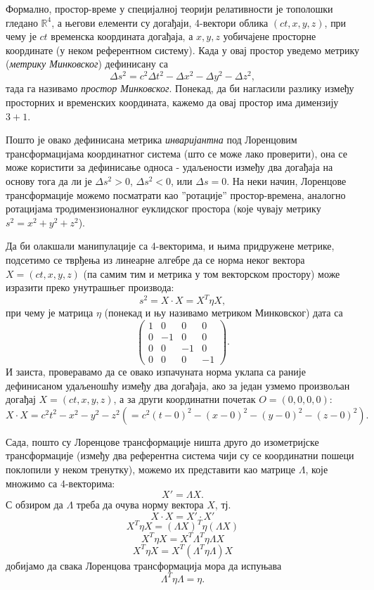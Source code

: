 \documentclass{report}
\theoremstyle{plain}
\theoremstyle{definition}
\begin{document}
Формално, простор-време у специјалној теорији релативности је тополошки гледано $\mathbb{R}^4$, а његови елементи су догађаји, 4-вектори облика $(ct, x, y, z)$, при чему је $ct$ временска координата догађаја, а $x, y, z$ уобичајене просторне координате (у неком референтном систему). Када у овај простор уведемо метрику (\emph{метрику Минковског}) дефинисану са
$$\Delta s^2 = c^2\Delta t^2 - \Delta x^2 - \Delta y^2 - \Delta z^2,$$
тада га називамо \emph{простор Минковског}. Понекад, да би нагласили разлику између просторних и временских координата, кажемо да овај простор има димензију $3+1$.

Пошто је овако дефинисана метрика \emph{инваријантна} под Лоренцовим трансформацијама координатног система (што се може лако проверити), она се може користити за дефинисање односа - удаљености између два догађаја на основу тога да ли је $\Delta s^2>0$, $\Delta s^2 <0$, или $\Delta s = 0$. На неки начин, Лоренцове трансформације можемо посматрати као ''ротације'' простор-времена, аналогно ротацијама тродимензионалног еуклидског простора (које чувају метрику $s^2 = x^2+y^2+z^2$).

Да би олакшали манипулације са 4-векторима, и њима придружене метрике, подсетимо се тврђења из линеарне алгебре да се норма неког вектора $X = (ct, x, y, z)$ (па самим тим и метрика у том векторском простору) може изразити преко унутрашњег производа:
$$s^2 = X\cdot X = X^T\eta X,$$
при чему је матрица $\eta$ (понекад и њу називамо метриком Минковског) дата са
$$\begin{pmatrix}
    1 &  0 &  0 &  0\\
    0 & -1 &  0 &  0\\
    0 &  0 & -1 &  0\\
    0 &  0 &  0 & -1
  \end{pmatrix}.$$
И заиста, проверавамо да се овако изпачуната норма уклапа са раније дефинисаном удаљеношћу између два догађаја, ако за један узмемо произвољан догађај $X = (ct, x, y, z)$, а за други координатни почетак $O = (0, 0, 0, 0)$:
$$X\cdot X = c^2t^2 - x^2 - y^2 - z^2 (= c^2(t-0)^2 - (x-0)^2 - (y-0)^2 - (z-0)^2).$$

Сада, пошто су Лоренцове трансформације ништа друго до изометријске трансформације (између два референтна система чији су се координатни пошеци поклопили у неком тренутку), можемо их представити као матрице $\Lambda$, које множимо са 4-векторима:
$$X' = \Lambda X.$$
С обзиром да $\Lambda$ треба да очува норму вектора $X$, тј.
$$ X\cdot X = X'\cdot X'$$
$$X^T\eta X = (\Lambda X)^T\eta (\Lambda X)$$
$$X^T\eta X = X^T \Lambda^T\eta \Lambda X$$
$$X^T\eta X = X^T (\Lambda^T\eta \Lambda) X$$
добијамо да свака Лоренцова трансформација мора да испуњава
\begin{equation}
\label{eq:matricna jednacina Lorentz}
\Lambda^T \eta \Lambda = \eta. \tag{*}
\end{equation}
\end{document}
